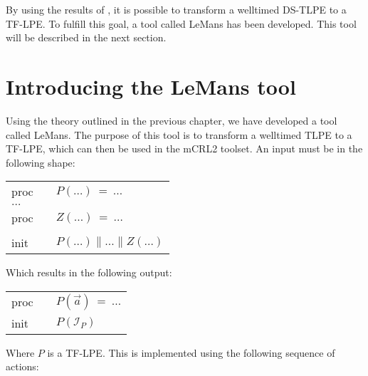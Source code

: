 By using the results of \cite{reniers02completenesstimed}, it is possible to transform a welltimed DS-TLPE to a TF-LPE. To fulfill this goal, a tool called LeMans has been developed. This tool will be described in the next section.

\section{Introducing the LeMans tool}
\label{sec:lemansintro}

Using the theory outlined in the previous chapter, we have developed a tool called LeMans. The purpose of this tool is to transform a welltimed TLPE to a TF-LPE, which can then be used in the mCRL2 toolset. An input must be in the following shape:

\begin{tabular}{lcl}
proc & & $P(\dots)~=~\dots$ \\
$\dots$ & & \\
proc & & $Z(\dots)~=~\dots$ \\
     & & \\
init & & $P(\dots) \parallel \dots \parallel Z(\dots)$ \\
\end{tabular}

Which results in the following output:

\begin{tabular}{lcl}
proc & & $P(\overrightarrow{a})~=~\dots$ \\
init & & $P(\mathcal{I}_P)$ \\
\end{tabular}

Where $P$ is a TF-LPE. This is implemented using the following sequence of actions:


